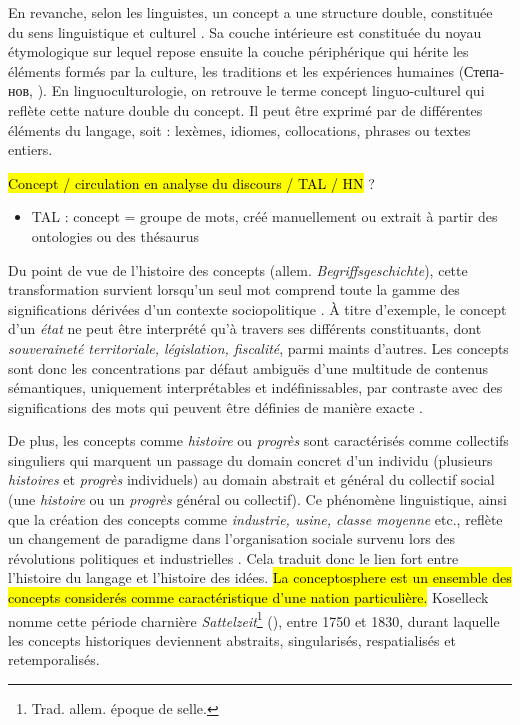 En revanche, selon les linguistes, un concept a une structure double, constituée du sens linguistique et culturel
 \citep{nemickiene2011concept}. Sa couche intérieure est constituée du noyau étymologique sur lequel repose ensuite la couche périphérique qui hérite les éléments formés par la culture, les traditions et les expériences humaines \foreignlanguage{russian}{(Степанов, \citeyear{stepanov2007}}). En linguoculturologie, on retrouve le terme \og{}concept linguo-culturel\fg{} qui reflète cette nature double du concept. Il peut être exprimé par de différentes éléments du langage, soit : lexèmes, idiomes, collocations, phrases ou textes entiers. 
 
 \hl{Concept / circulation en analyse du discours / TAL / HN} ?  
\begin{itemize}
\item TAL : concept = groupe de mots, créé manuellement ou extrait à partir des ontologies ou des thésaurus
\end{itemize}



Du point de vue de l'histoire des concepts (allem. \textit{Begriffsgeschichte}), cette transformation survient lorsqu'un seul mot comprend toute la gamme des significations dérivées d'un contexte sociopolitique \citep[p. 258]{koselleck2011introduction}. À titre d'exemple, le concept d'un \textit{état} ne peut être interprété qu'à travers ses différents constituants, dont \textit{souveraineté territoriale, législation, fiscalité}, parmi maints d'autres. Les concepts sont donc les concentrations par défaut ambiguës d'une multitude de contenus sémantiques, uniquement interprétables et indéfinissables, par contraste avec des significations des mots qui peuvent être définies de manière exacte \citep[p. 20]{koselleck2011introduction}. 

De plus, les concepts comme \textit{histoire} ou \textit{progrès} sont caractérisés comme \og{}collectifs singuliers\fg{} qui marquent un passage du domain concret d'un individu (plusieurs \textit{histoires} et \textit{progrès} individuels) au domain abstrait et général du collectif social (une \textit{histoire} ou un \textit{progrès} général ou collectif).  Ce phénomène linguistique, ainsi que la création des concepts comme \textit{industrie, usine, classe moyenne} etc., reflète un changement de paradigme dans l'organisation sociale survenu lors des révolutions politiques et industrielles \citep[p. 1]{hobsbawm2010age}. Cela traduit donc le lien fort entre l'histoire du langage et l'histoire des idées. \hl{La conceptosphere est un ensemble des concepts considerés comme caractéristique d'une nation particulière.} Koselleck nomme cette période charnière \textit{Sattelzeit}\footnote{Trad. allem. \og{}époque de selle\fg{}.} (\citeyear[p. 8]{koselleck2011introduction}), entre 1750 et 1830, durant laquelle les concepts historiques deviennent abstraits, singularisés, respatialisés et retemporalisés.
 
